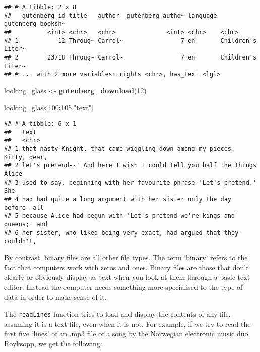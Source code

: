 \documentclass[]{book}
\newenvironment{Shaded}{\begin{snugshade}}{\end{snugshade}}
\newcommand{\KeywordTok}[1]{\textcolor[rgb]{0.13,0.29,0.53}{\textbf{#1}}}
\newcommand{\DecValTok}[1]{\textcolor[rgb]{0.00,0.00,0.81}{#1}}
\newcommand{\StringTok}[1]{\textcolor[rgb]{0.31,0.60,0.02}{#1}}
\newcommand{\OperatorTok}[1]{\textcolor[rgb]{0.81,0.36,0.00}{\textbf{#1}}}
\newcommand{\NormalTok}[1]{#1}
\theoremstyle{definition}
\theoremstyle{definition}
\theoremstyle{definition}
\theoremstyle{remark}
\begin{document}
\begin{verbatim}
## # A tibble: 2 x 8
##   gutenberg_id title   author  gutenberg_autho~ language gutenberg_booksh~
##          <int> <chr>   <chr>              <int> <chr>    <chr>            
## 1           12 Throug~ Carrol~                7 en       Children's Liter~
## 2        23718 Throug~ Carrol~                7 en       Children's Liter~
## # ... with 2 more variables: rights <chr>, has_text <lgl>
\end{verbatim}

\begin{Shaded}
\begin{Highlighting}[]
\NormalTok{looking_glass <-}\StringTok{ }\KeywordTok{gutenberg_download}\NormalTok{(}\DecValTok{12}\NormalTok{)}

\NormalTok{looking_glass[}\DecValTok{100}\OperatorTok{:}\DecValTok{105}\NormalTok{,}\StringTok{"text"}\NormalTok{]}
\end{Highlighting}
\end{Shaded}

\begin{verbatim}
## # A tibble: 6 x 1
##   text                                                                    
##   <chr>                                                                   
## 1 that nasty Knight, that came wiggling down among my pieces. Kitty, dear,
## 2 let's pretend--' And here I wish I could tell you half the things Alice 
## 3 used to say, beginning with her favourite phrase 'Let's pretend.' She   
## 4 had had quite a long argument with her sister only the day before--all  
## 5 because Alice had begun with 'Let's pretend we're kings and queens;' and
## 6 her sister, who liked being very exact, had argued that they couldn't,
\end{verbatim}

By contrast, binary files are all other file types. The term `binary'
refers to the fact that computers work with zeros and ones. Binary files
are those that don't clearly or obviously display as text when you look
at them through a basic text editor. Instead the computer needs
something more specialised to the type of data in order to make sense of
it.

The \texttt{readLines} function tries to load and display the contents
of any file, assuming it is a text file, even when it is not. For
example, if we try to read the first five `lines' of an .mp3 file of a
song by the Norwegian electronic music duo Royksopp, we get the
following:
\end{document}
